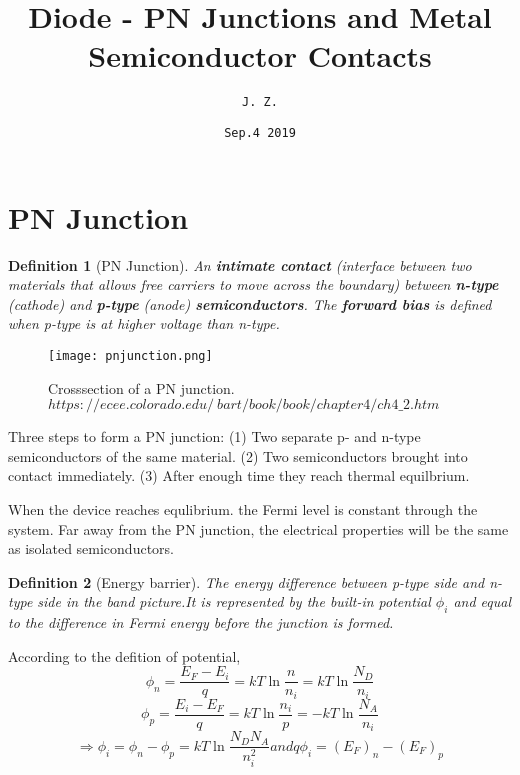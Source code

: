 \documentclass{article}
\title{\textbf{Diode - PN Junctions and Metal Semiconductor Contacts}}   %
\author{\texttt{J. Z.}}  %
\date{\texttt{Sep.4 2019}}  %
\newtheorem{thm2}{Definition}
\begin{document}
	
	\maketitle  %
	\tableofcontents %
	
	\section{PN Junction}
	
	\begin{thm2}[PN Junction]
	An \textbf{intimate contact} (interface between two materials that allows free carriers to move across the boundary) between \textbf{n-type} (cathode) and \textbf{p-type} (anode) \textbf{semiconductors}. The \textbf{forward bias} is defined when p-type is at higher voltage than n-type.
	\end{thm2}
	
	\begin{figure}[H]
		\centering
		\texttt{[image: pnjunction.png]}
		\caption{Crosssection of a PN junction. $https://ecee.colorado.edu/~bart/book/book/chapter4/ch4\_2.htm$ }
		\label{Fig1}
 	\end{figure}
 
    \begin{center}
    
    \end{center}
 
    Three steps to form a PN junction:  (1) Two separate p- and n-type semiconductors of the same material. (2) Two semiconductors brought into contact immediately. (3) After enough time they reach thermal equilbrium.
    
    When the device reaches equlibrium. the Fermi level is constant through the system. Far away from the PN junction, the electrical properties will be the same as isolated semiconductors.
    
    \begin{thm2}[Energy barrier]
    	The energy difference between p-type side and n-type side in the band picture.It is represented by the built-in potential $\phi_i$ and equal to the difference in Fermi energy before the junction is formed.
    \end{thm2}
    
    According to the defition of potential, 
    \[\phi_n =\frac{E_F-E_i}{q} = kT\ln\frac{n}{n_i}= kT\ln\frac{N_D}{n_i}\]
    \[\phi_p =\frac{E_i-E_F}{q} = kT\ln\frac{n_i}{p}= - kT\ln\frac{N_A}{n_i}\]
    \[\Rightarrow \phi_i = \phi_n - \phi_p = kT\ln\frac{N_DN_A}{n_i^2} and q\phi_i =(E_F)_n-(E_F)_p\]
    
\end{document}
